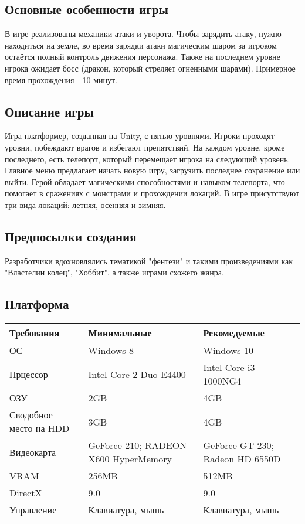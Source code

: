 \documentclass{article}
\begin{document}
\subsection{Основные особенности игры}
В игре реализованы механики атаки и уворота. Чтобы зарядить атаку, нужно находиться на земле, во время зарядки атаки магическим шаром за игроком остаётся полный контроль движения персонажа. Также на последнем уровне игрока ожидает босс (дракон, который стреляет огненными шарами).
Примерное время прохождения - 10 минут.

\subsection{Описание игры}
Игра-платформер, созданная на Unity, с пятью уровнями. Игроки проходят уровни, побеждают врагов и избегают препятствий. На каждом уровне, кроме последнего, есть телепорт, который перемещает игрока на следующий уровень. Главное меню предлагает начать новую игру, загрузить последнее сохранение или выйти. Герой обладает магическими способностями и навыком телепорта, что помогает в сражениях с монстрами и прохождении локаций. В игре присутствуют три вида локаций: летняя, осенняя и зимняя. 

\subsection{Предпосылки создания}
 Разработчики вдохновлялись тематикой "фентези" и такими произведениями как "Властелин колец", "Хоббит", а также играми схожего жанра.
\subsection{Платформа}
\begin{tabularx}{\textwidth}{|X|X|X|} \hline  
    Требования&  Минимальные& Рекомедуемые\\ \hline  
    ОС&  Windows 8& Windows 10\\ \hline  
    Прцессор&  Intel Core 2 Duo E4400& Intel Core i3-1000NG4\\ \hline  
    ОЗУ&  2GB& 4GB\\ \hline  
    Сводобное место на HDD&  3GB& 4GB\\ \hline  
    Видеокарта&   GeForce 210; RADEON X600  HyperMemory&  GeForce GT 230; Radeon HD 6550D\\ \hline  
    VRAM&  256MB& 512MB\\ \hline  
    DirectX&  9.0& 9.0\\ \hline  
    Управление&  Клавиатура, мышь& Клавиатура, мышь\\ \hline 
\end{tabularx}    
\end{document}
